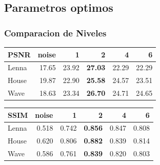 \documentclass{beamer}
\begin{document}
  \subsection{Parametros optimos}

  \begin{frame}
    \frametitle{ Comparacion de Niveles }
    \centering
    \begin{tabular}{lrrrrr}
      \toprule
      {PSNR} &  noise &      1 &      2 &      4 &      6 \\
      \midrule
      Lenna &  17.65 &  23.92 &  \bf{27.03} &  22.29 &  22.29 \\
      House &  19.87 &  22.90 &  \bf{25.58} &  24.57 &  23.51 \\
      Wave &  18.63 &  23.34 &  \bf{26.70} &  24.71 &  24.65 \\
      \bottomrule
      \end{tabular}
  
      \begin{tabular}{lrrrrr}
        {SSIM} &  noise &      1 &      2 &      4 &      6 \\
        \midrule
        Lenna &  0.518 &  0.742 &  \bf{0.856} &  0.847 &  0.808 \\
        House &  0.620 &  0.806 &  \bf{0.882} &  0.839 &  0.814 \\
        Wave &  0.586 &  0.761 &  \bf{0.839} &  0.820 &  0.803 \\
        \bottomrule
        \end{tabular}

  \end{frame}
\end{document}
